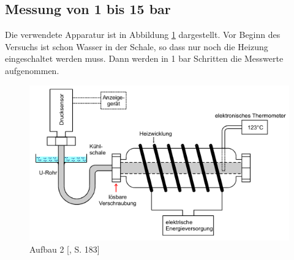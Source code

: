 \subsection{Messung von 1 bis 15 bar}
Die verwendete Apparatur ist in Abbildung \ref{fig:aufbau2} dargestellt. Vor Beginn des Versuchs ist schon Wasser in der Schale, so dass nur noch die Heizung eingeschaltet
werden muss. Dann werden in 1 bar Schritten die Messwerte aufgenommen.
\begin{figure}
  \centering
  \includegraphics{Aufbau2.png}
  \caption{Aufbau 2 [\cite{sample}, S. 183]}
  \label{fig:aufbau2}
\end{figure}